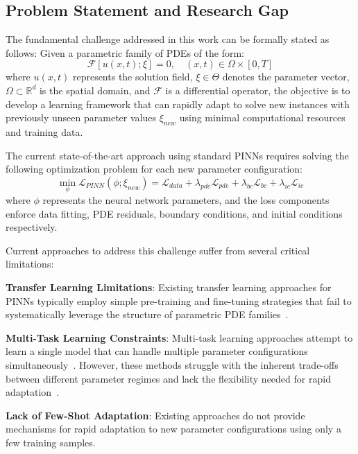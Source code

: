\documentclass[review]{elsarticle}
\begin{document}
\subsection{Problem Statement and Research Gap}

The fundamental challenge addressed in this work can be formally stated as follows: Given a parametric family of PDEs of the form:
\begin{equation}
\mathcal{F}[u(x,t); \xi] = 0, \quad (x,t) \in \Omega \times [0,T]
\end{equation}
where $u(x,t)$ represents the solution field, $\xi \in \Theta$ denotes the parameter vector, $\Omega \subset \mathbb{R}^d$ is the spatial domain, and $\mathcal{F}$ is a differential operator, the objective is to develop a learning framework that can rapidly adapt to solve new instances with previously unseen parameter values $\xi_{new}$ using minimal computational resources and training data.

The current state-of-the-art approach using standard PINNs requires solving the following optimization problem for each new parameter configuration:
\begin{equation}
\min_{\phi} \mathcal{L}_{PINN}(\phi; \xi_{new}) = \mathcal{L}_{data} + \lambda_{pde} \mathcal{L}_{pde} + \lambda_{bc} \mathcal{L}_{bc} + \lambda_{ic} \mathcal{L}_{ic}
\end{equation}
where $\phi$ represents the neural network parameters, and the loss components enforce data fitting, PDE residuals, boundary conditions, and initial conditions respectively.

Current approaches to address this challenge suffer from several critical limitations:

\textbf{Transfer Learning Limitations}: Existing transfer learning approaches for PINNs typically employ simple pre-training and fine-tuning strategies that fail to systematically leverage the structure of parametric PDE families~\cite{goswami2020transfer,chakraborty2021transfer}.

\textbf{Multi-Task Learning Constraints}: Multi-task learning approaches attempt to learn a single model that can handle multiple parameter configurations simultaneously~\cite{pan2009survey}. However, these methods struggle with the inherent trade-offs between different parameter regimes and lack the flexibility needed for rapid adaptation~\cite{hospedales2021meta}.

\textbf{Lack of Few-Shot Adaptation}: Existing approaches do not provide mechanisms for rapid adaptation to new parameter configurations using only a few training samples.
\end{document}
